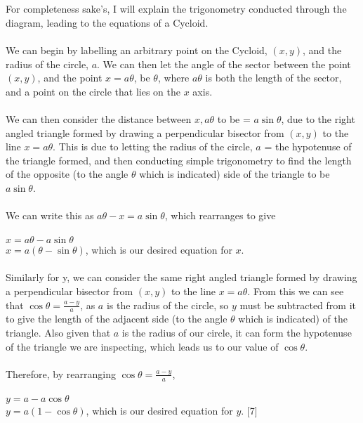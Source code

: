 \documentclass[12pt]{report}
\begin{document}
\\
\\
For completeness sake's, I will explain the trigonometry conducted through the diagram, leading to the equations of a Cycloid.
\\
\\
We can begin by labelling an arbitrary point on the Cycloid, \((x, y)\), and the radius of the circle, \(a\). We can then let the angle of the sector between the point \((x, y)\), and the point \(x = a\theta\), be \(\theta\), where  \(a\theta\) is both the length of the sector, and a point on the circle that lies on the \(x\) axis.
\\
\\
We can then consider the distance between \(x, a\theta\) to be = \(a\sin{\theta}\), due to the right angled triangle formed by drawing a perpendicular bisector from \((x, y)\) to the line \(x = a\theta\). This is due to letting the radius of the circle, \(a\) = the hypotenuse of the triangle formed, and then conducting simple trigonometry to find the length of the opposite (to the angle \(\theta\) which is indicated) side of the triangle to be \(a\sin{\theta}\).
\\
\\
We can write this as \(a\theta - x = a\sin{\theta}\), which rearranges to give
\\
\\
\(x = a\theta - a\sin{\theta}\)
\\
\implies \(x = a(\theta -\sin{\theta})\), which is our desired equation for \(x\).
\\
\\
Similarly for y, we can consider the same right angled triangle formed by drawing a perpendicular bisector from \((x, y)\) to the line \(x = a\theta\). From this we can see that \(\cos{\theta} = \frac{a-y}{a}\), as \(a\) is the radius of the circle, so \(y\) must be subtracted from it to give the length of the adjacent side (to the angle \(\theta\) which is indicated) of the triangle. Also given that \(a\) is the radius of our circle, it can form the hypotenuse of the triangle we are inspecting, which leads us to our value of \(\cos{\theta}\).
\\
\\
Therefore, by rearranging \(\cos{\theta} = \frac{a-y}{a}\), 
\\
\\
\(y = a-a\cos{\theta}\)
\\
\implies \(y = a(1-\cos{\theta})\), which is our desired equation for \(y\).
[7] 
\end{document}

